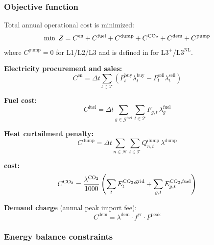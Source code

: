 \documentclass[review,3p]{elsarticle}
\newcommand{\Lplus}{\mathrm{L3}^{+}}
\newcommand{\Lnl}{\mathrm{L3}^{\mathrm{NL}}}
\begin{document}
\subsubsection{Objective function}

Total annual operational cost is minimized:
%
\begin{equation}
  \min \; Z = C^{\mathrm{en}} + C^{\mathrm{fuel}}
    + C^{\mathrm{dump}} + C^{\ce{CO2}} + C^{\mathrm{dem}}
    + C^{\mathrm{pump}}
  \label{eq:objective}
\end{equation}
%
where $C^{\mathrm{pump}} = 0$ for L1/L2/L3 and is defined in
 for $\Lplus$/$\Lnl$.

\textbf{Electricity procurement and sales:}
\begin{equation}
  C^{\mathrm{en}} = \Delta t \sum_{t \in \mathcal{T}} \left(
    P_t^{\mathrm{buy}} \lambda_t^{\mathrm{buy}}
    - P_t^{\mathrm{sell}} \lambda_t^{\mathrm{sell}} \right)
  \label{eq:cost_energy}
\end{equation}

\textbf{Fuel cost:}
\begin{equation}
  C^{\mathrm{fuel}} = \Delta t
    \sum_{g \in \mathcal{G}^{\mathrm{fuel}}}
    \sum_{t \in \mathcal{T}} F_{g,t}\, \lambda_g^{\mathrm{fuel}}
  \label{eq:cost_fuel}
\end{equation}

\textbf{Heat curtailment penalty:}
\begin{equation}
  C^{\mathrm{dump}} = \Delta t \sum_{n \in \mathcal{N}}
    \sum_{t \in \mathcal{T}} Q_{n,t}^{\mathrm{dump}}\,
    \lambda^{\mathrm{dump}}
  \label{eq:cost_dump}
\end{equation}

\textbf{ cost:}
\begin{equation}
  C^{\ce{CO2}} = \frac{\lambda^{\ce{CO2}}}{1000} \left(
    \sum_{t} E_t^{\ce{CO2},\mathrm{grid}}
    + \sum_{g,t} E_{g,t}^{\ce{CO2},\mathrm{fuel}} \right)
  \label{eq:cost_co2}
\end{equation}

\textbf{Demand charge} (annual peak import fee):
\begin{equation}
  C^{\mathrm{dem}} = \lambda^{\mathrm{dem}} \cdot f^{\mathrm{yr}}
    \cdot P^{\mathrm{peak}}
  \label{eq:cost_demand}
\end{equation}

\subsubsection{Energy balance constraints}
\label{sec:model_balance}
\end{document}
